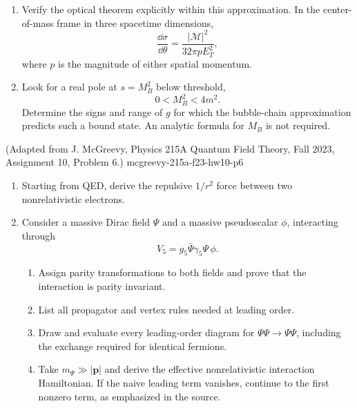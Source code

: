 \begin{enumerate}
\begin{enumerate}
two-bubble term, and their continuation.  Do not justify the
approximation or the convergence of the series.  The loop may be left
as a Feynman-parameter integral.
\item
Verify the optical theorem explicitly within this approximation.  In
the center-of-mass frame in three spacetime dimensions,
\[
 \frac{\dd\sigma}{\dd\theta}
 =\frac{|\mathcal M|^2}{32\pi pE_T^2},
\]
where \(p\) is the magnitude of either spatial momentum.
\item
Look for a real pole at \(s=M_B^2\) below threshold,
\[
 0<M_B^2<4m^2.
\]
Determine the signs and range of \(g\) for which the bubble-chain
approximation predicts such a bound state.  An analytic formula for
\(M_B\) is not required.
\end{enumerate}

  {(Adapted from J. McGreevy, Physics 215A Quantum Field Theory, Fall 2023, Assignment 10, Problem 6.)}
  {mcgreevy-215a-f23-hw10-p6}
\begin{enumerate}
\item
Starting from QED, derive the repulsive \(1/r^2\) force between two
nonrelativistic electrons.
\item
Consider a massive Dirac field \(\Psi\) and a massive pseudoscalar
\(\phi\), interacting through
\[
 V_5=g_5\bar\Psi\gamma_5\Psi\,\phi.
\]
\begin{enumerate}
\item Assign parity transformations to both fields and prove that the
interaction is parity invariant.
\item List all propagator and vertex rules needed at leading order.
\item Draw and evaluate every leading-order diagram for
\(\Psi\Psi\to\Psi\Psi\), including the exchange required for identical
fermions.
\item Take \(m_\Psi\gg|\mathbf p|\) and derive the effective
nonrelativistic interaction Hamiltonian.  If the naive leading term
vanishes, continue to the first nonzero term, as emphasized in the
source.
\end{enumerate}
\end{enumerate}
\end{enumerate}
